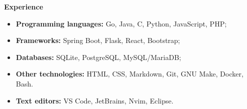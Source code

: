 {\vspace{0.5cm} \hspace{-0.5cm} \Large \textbf{Experience}}

\begin{itemize}
    \item \textbf{Programming languages:} Go, Java, C, Python, JavaScript, PHP;
    \item \textbf{Frameworks:} Spring Boot, Flask, React, Bootstrap;
    \item \textbf{Databases:} SQLite, PostgreSQL, MySQL/MariaDB;
    \item \textbf{Other technologies:} HTML, CSS, Markdown, Git, GNU Make, Docker, Bash.
    \item \textbf{Text editors:} VS Code, JetBrains, Nvim, Eclipse.
\end{itemize}
